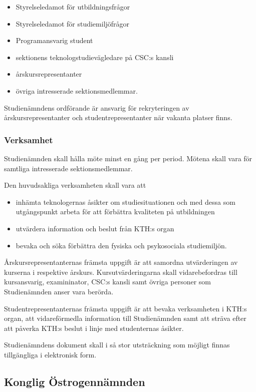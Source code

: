 \documentclass[a4paper,12pt]{article}
\begin{document}
\begin{itemize}
  \item Styrelseledamot för utbildningsfrågor
  \item Styrelseledamot för studiemiljöfrågor
  \item Programansvarig student
  \item sektionens teknologstudievägledare på CSC:s kansli
  \item årskursrepresentanter
  \item övriga intresserade sektionsmedlemmar.
\end{itemize}

Studienämndens ordförande är ansvarig för rekryteringen av årskursrepresentanter och studentrepresentanter när vakanta platser finns.

\subsubsection{Verksamhet}

Studienämnden skall hålla möte minst en gång per period. Mötena skall vara för samtliga intresserade sektionsmedlemmar.

Den huvudsakliga verksamheten skall vara att

\begin{itemize}
  \item inhämta teknologernas åsikter om studiesituationen och med dessa som utgångspunkt arbeta för att förbättra kvaliteten på utbildningen
  \item utvärdera information och beslut från KTH:s organ
  \item bevaka och söka förbättra den fysiska och psykosociala studiemiljön.
\end{itemize}

Årskursrepresentanternas främsta uppgift är att samordna utvärderingen av kurserna i respektive årskurs. Kursutvärderingarna skall vidarebefordras till kursansvarig, examininator, CSC:s kansli samt övriga personer som Studienämnden anser vara berörda.

Studentrepresentanternas främsta uppgift är att bevaka verksamheten i KTH:s organ, att vidareförmedla information till Studienämnden samt att sträva efter att påverka KTH:s beslut i linje med studenternas åsikter.

Studienämndens dokument skall i så stor utsträckning som möjligt finnas tillgängliga i elektronisk form.

\subsection{Konglig Östrogennämnden}
\end{document}
